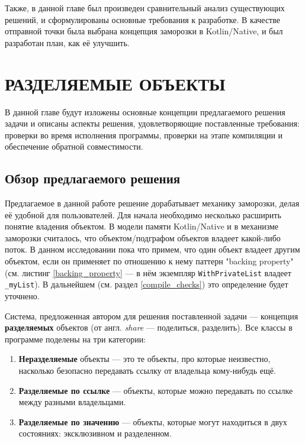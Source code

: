 \documentclass[specification,annotation,times]{itmo-student-thesis}
\begin{document}
Также, в данной главе был произведен сравнительный анализ существующих решений, и сформулированы основные требования к разработке.
В качестве отправной точки была выбрана концепция заморозки в Kotlin/Native, и был разработан план, как её улучшить.



\chapter{РАЗДЕЛЯЕМЫЕ ОБЪЕКТЫ}

В данной главе будут изложены основные концепции предлагаемого решения задачи и описаны аспекты решения, удовлетворяющие поставленные требования: проверки во время исполнения программы, проверки на этапе компиляции и обеспечение обратной совместимости.

\section{Обзор предлагаемого решения}\label{overview}

Предлагаемое в данной работе решение дорабатывает механику заморозки, делая её удобной для пользователей.
Для начала необходимо несколько расширить понятие владения объектом.
В модели памяти Kotlin/Native и в механизме заморозки считалось, что объектом/подграфом объектов владеет какой-либо поток.
В данном исследовании пока что примем, что один объект владеет другим объектом, если он применяет по отношению к нему паттерн "backing property" (см. листинг \ref{backing_property} --- в нём экземпляр \texttt{WithPrivateList} владеет \texttt{\_myList}). В дальнейшем (см. раздел \ref{compile_checks}) это определение будет уточнено.

Система, предложенная автором для решения поставленной задачи --- концепция \textbf{разделяемых} объектов (от англ. \textit{share} --- поделиться, разделить).
Все классы в программе поделены на три категории:
\begin{enumerate}
	\item \textbf{Неразделяемые} объекты --- это те объекты, про которые неизвестно, насколько безопасно передавать ссылку от владельца кому-нибудь ещё.
	\item \textbf{Разделяемые по ссылке} --- объекты, которые можно передавать по ссылке между разными владельцами.
	\item \textbf{Разделяемые по значению} --- объекты, которые могут находиться в двух состояниях: эксклюзивном и разделенном.
\end{enumerate}
\end{document}
